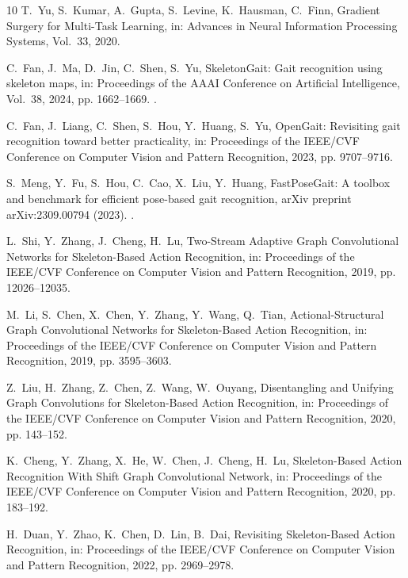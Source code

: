 \documentclass[review,12pt]{elsarticle}
\begin{document}
\begin{thebibliography}{10}
T.~Yu, S.~Kumar, A.~Gupta, S.~Levine, K.~Hausman, C.~Finn, {Gradient Surgery
  for Multi-Task Learning}, in: {Advances in Neural Information Processing
  Systems}, Vol.~33, 2020.

C.~Fan, J.~Ma, D.~Jin, C.~Shen, S.~Yu, {SkeletonGait}: Gait recognition using
  skeleton maps, in: {Proceedings of the AAAI Conference on Artificial
  Intelligence}, Vol.~38, 2024, pp. 1662--1669.
\newblock \href {https://doi.org/10.1609/aaai.v38i2.27933}
  {}.

C.~Fan, J.~Liang, C.~Shen, S.~Hou, Y.~Huang, S.~Yu, {OpenGait}: Revisiting gait
  recognition toward better practicality, in: {Proceedings of the IEEE/CVF
  Conference on Computer Vision and Pattern Recognition}, 2023, pp. 9707--9716.

S.~Meng, Y.~Fu, S.~Hou, C.~Cao, X.~Liu, Y.~Huang, {FastPoseGait}: A toolbox and
  benchmark for efficient pose-based gait recognition, arXiv preprint
  arXiv:2309.00794 (2023).
\newblock \href {https://doi.org/10.48550/arXiv.2309.00794}
  {}.

L.~Shi, Y.~Zhang, J.~Cheng, H.~Lu, {Two-Stream Adaptive Graph Convolutional
  Networks for Skeleton-Based Action Recognition}, in: {Proceedings of the
  IEEE/CVF Conference on Computer Vision and Pattern Recognition}, 2019, pp.
  12026--12035.

M.~Li, S.~Chen, X.~Chen, Y.~Zhang, Y.~Wang, Q.~Tian, {Actional-Structural Graph
  Convolutional Networks for Skeleton-Based Action Recognition}, in:
  {Proceedings of the IEEE/CVF Conference on Computer Vision and Pattern
  Recognition}, 2019, pp. 3595--3603.

Z.~Liu, H.~Zhang, Z.~Chen, Z.~Wang, W.~Ouyang, {Disentangling and Unifying
  Graph Convolutions for Skeleton-Based Action Recognition}, in: {Proceedings
  of the IEEE/CVF Conference on Computer Vision and Pattern Recognition}, 2020,
  pp. 143--152.

K.~Cheng, Y.~Zhang, X.~He, W.~Chen, J.~Cheng, H.~Lu, {Skeleton-Based Action
  Recognition With Shift Graph Convolutional Network}, in: {Proceedings of the
  IEEE/CVF Conference on Computer Vision and Pattern Recognition}, 2020, pp.
  183--192.

H.~Duan, Y.~Zhao, K.~Chen, D.~Lin, B.~Dai, {Revisiting Skeleton-Based Action
  Recognition}, in: {Proceedings of the IEEE/CVF Conference on Computer Vision
  and Pattern Recognition}, 2022, pp. 2969--2978.


\end{thebibliography}
\end{document}
